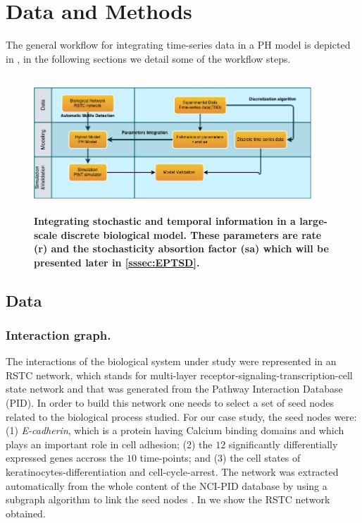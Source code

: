 
\section{Data and Methods}

The general workflow for integrating time-series data in a PH model is depicted in , in the following sections we 
detail some of the workflow steps.
\begin{figure}[H]
 \centering
 \includegraphics[width=4.1in,height=2in]{images/workflow-2.png}
\caption{{\bf Integrating stochastic and temporal information in a large-scale discrete biological model. These parameters are rate (r) and the stochasticity absortion factor (sa) which 
will be presented later in \ref{sssec:EPTSD}.}} 
 \label{fig:workflow}
\end{figure}


\subsection{Data}

\subsubsection{Interaction graph.}
\label{ssec:RSTC}
The interactions of the biological system under study were represented in
 an RSTC network, which stands for  multi-layer receptor-signaling-transcription-cell state network and that was generated from the Pathway Interaction Database (PID).
In order to build this network one needs to select a set of seed nodes related to the biological process studied.
For our case study, the seed nodes were:  (1) \emph{E-cadherin}, which is a protein having Calcium binding domains and which plays an important role in cell adhesion;
(2) the $12$ significantly differentially expressed genes accross the $10$ time-points; and (3) the cell states of keratinocytes-differentiation and cell-cycle-arrest. 
The network was extracted automatically from the whole content of the NCI-PID database by using a subgraph algorithm to link the seed nodes \cite{guziolowski2012automatic}. 
In  we show the RSTC network obtained. 


